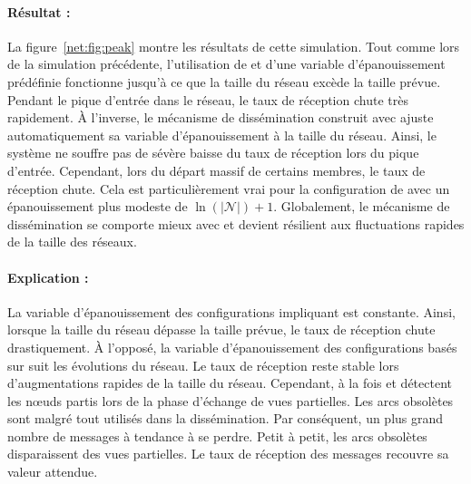 \paragraph{Résultat :} La figure~\ref{net:fig:peak} montre les résultats de
cette simulation. Tout comme lors de la simulation précédente, l'utilisation de
\CYCLON et d'une variable d'épanouissement prédéfinie fonctionne jusqu'à ce que
la taille du réseau excède la taille prévue. Pendant le pique d'entrée dans le
réseau, le taux de réception chute très rapidement. À l'inverse, le mécanisme de
dissémination construit avec \LSEQ ajuste automatiquement sa variable
d'épanouissement à la taille du réseau. Ainsi, le système ne souffre pas de
sévère baisse du taux de réception lors du pique d'entrée. Cependant, lors du
départ massif de certains membres, le taux de réception chute. Cela est
particulièrement vrai pour la configuration de \SPRAY avec un épanouissement
plus modeste de $\ln(|\mathcal{N}|)+1$. Globalement, le mécanisme de
dissémination se comporte mieux avec \SPRAY et devient résilient aux
fluctuations rapides de la taille des réseaux.

\paragraph{Explication :} La variable d'épanouissement des configurations
impliquant \CYCLON est constante. Ainsi, lorsque la taille du réseau dépasse la
taille prévue, le taux de réception chute drastiquement. À l'opposé, la
variable d'épanouissement des configurations basés sur \SPRAY suit les
évolutions du réseau. Le taux de réception reste stable lors d'augmentations
rapides de la taille du réseau. Cependant, à la fois \CYCLON et \SPRAY détectent
les nœuds partis lors de la phase d'échange de vues partielles. Les arcs
obsolètes sont malgré tout utilisés dans la dissémination. Par conséquent, un
plus grand nombre de messages à tendance à se perdre. Petit à petit, les arcs
obsolètes disparaissent des vues partielles. Le taux de réception des messages
recouvre sa valeur attendue.

